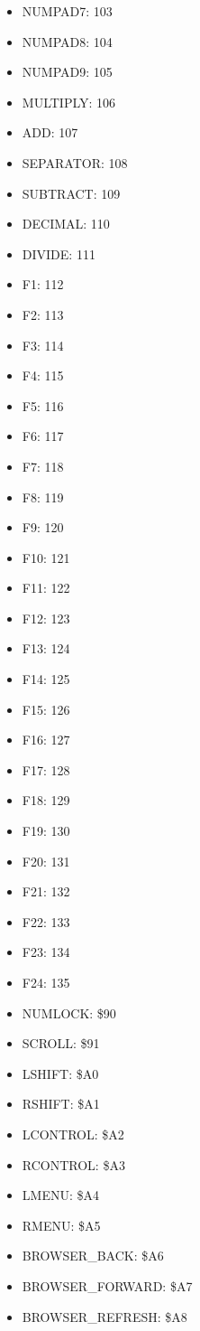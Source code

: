 \documentclass[a4paper]{report}
\begin{document}
\begin{itemize}
\item   NUMPAD7: 103
\item   NUMPAD8: 104
\item   NUMPAD9: 105
\item   MULTIPLY: 106
\item   ADD: 107
\item   SEPARATOR: 108
\item   SUBTRACT: 109
\item   DECIMAL: 110
\item   DIVIDE: 111
\item   F1: 112
\item   F2: 113
\item   F3: 114
\item   F4: 115
\item   F5: 116
\item   F6: 117
\item   F7: 118
\item   F8: 119
\item   F9: 120
\item   F10: 121
\item   F11: 122
\item   F12: 123
\item   F13: 124
\item   F14: 125
\item   F15: 126
\item   F16: 127
\item   F17: 128
\item   F18: 129
\item   F19: 130
\item   F20: 131
\item   F21: 132
\item   F22: 133
\item   F23: 134
\item   F24: 135
\item   NUMLOCK: \$90
\item   SCROLL: \$91
\item   LSHIFT: \$A0
\item   RSHIFT: \$A1
\item   LCONTROL: \$A2
\item   RCONTROL: \$A3
\item   LMENU: \$A4
\item   RMENU: \$A5
\item   BROWSER\_BACK: \$A6
\item   BROWSER\_FORWARD: \$A7
\item   BROWSER\_REFRESH: \$A8

\end{itemize}
\end{document}
